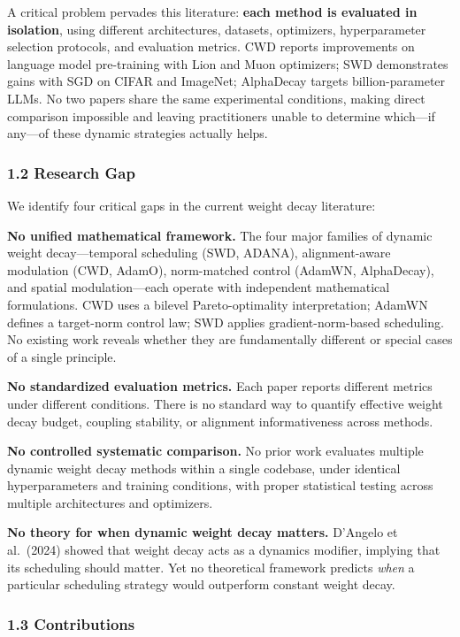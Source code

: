 \documentclass[
]{article}
\begin{document}
A critical problem pervades this literature: \textbf{each method is
evaluated in isolation}, using different architectures, datasets,
optimizers, hyperparameter selection protocols, and evaluation metrics.
CWD reports improvements on language model pre-training with Lion and
Muon optimizers; SWD demonstrates gains with SGD on CIFAR and ImageNet;
AlphaDecay targets billion-parameter LLMs. No two papers share the same
experimental conditions, making direct comparison impossible and leaving
practitioners unable to determine which---if any---of these dynamic
strategies actually helps.

\hypertarget{research-gap}{%
\subsubsection{1.2 Research Gap}\label{research-gap}}

We identify four critical gaps in the current weight decay literature:

\textbf{No unified mathematical framework.} The four major families of
dynamic weight decay---temporal scheduling (SWD, ADANA), alignment-aware
modulation (CWD, AdamO), norm-matched control (AdamWN, AlphaDecay), and
spatial modulation---each operate with independent mathematical
formulations. CWD uses a bilevel Pareto-optimality interpretation;
AdamWN defines a target-norm control law; SWD applies
gradient-norm-based scheduling. No existing work reveals whether they
are fundamentally different or special cases of a single principle.

\textbf{No standardized evaluation metrics.} Each paper reports
different metrics under different conditions. There is no standard way
to quantify effective weight decay budget, coupling stability, or
alignment informativeness across methods.

\textbf{No controlled systematic comparison.} No prior work evaluates
multiple dynamic weight decay methods within a single codebase, under
identical hyperparameters and training conditions, with proper
statistical testing across multiple architectures and optimizers.

\textbf{No theory for when dynamic weight decay matters.} D'Angelo et
al.~(2024) showed that weight decay acts as a dynamics modifier,
implying that its scheduling should matter. Yet no theoretical framework
predicts \emph{when} a particular scheduling strategy would outperform
constant weight decay.

\hypertarget{contributions}{%
\subsubsection{1.3 Contributions}\label{contributions}}
\end{document}
